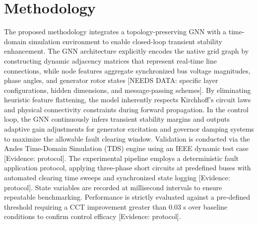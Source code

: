 \documentclass[11pt,a4paper]{article}
\begin{document}
\section{Methodology}
The proposed methodology integrates a topology-preserving GNN with a time-domain simulation environment to enable closed-loop transient stability enhancement. The GNN architecture explicitly encodes the native grid graph by constructing dynamic adjacency matrices that represent real-time line connections, while node features aggregate synchronized bus voltage magnitudes, phase angles, and generator rotor states [NEEDS DATA: specific layer configurations, hidden dimensions, and message-passing schemes]. By eliminating heuristic feature flattening, the model inherently respects Kirchhoff’s circuit laws and physical connectivity constraints during forward propagation. In the control loop, the GNN continuously infers transient stability margins and outputs adaptive gain adjustments for generator excitation and governor damping systems to maximize the allowable fault clearing window. Validation is conducted via the Andes Time-Domain Simulation (TDS) engine using an IEEE dynamic test case [Evidence: protocol]. The experimental pipeline employs a deterministic fault application protocol, applying three-phase short circuits at predefined buses with automated clearing time sweeps and synchronized state logging [Evidence: protocol]. State variables are recorded at millisecond intervals to ensure repeatable benchmarking. Performance is strictly evaluated against a pre-defined threshold requiring a CCT improvement greater than 0.03 s over baseline conditions to confirm control efficacy [Evidence: protocol].
\end{document}
